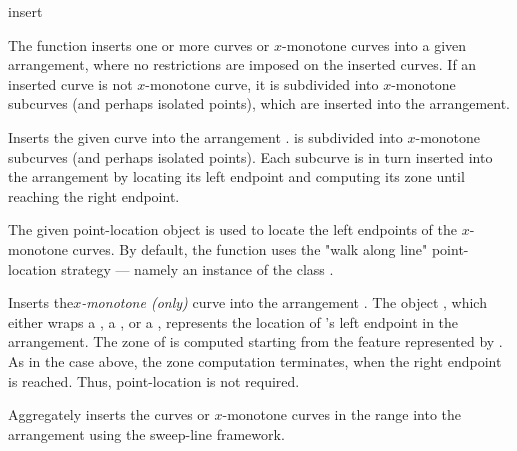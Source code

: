 \ccRefPageBegin

\begin{ccRefFunction}{insert}

\ccDefinition

The function \ccRefName{} inserts one or more curves or $x$-monotone curves
into a given arrangement, where no restrictions are imposed on the inserted
curves. If an inserted curve is not $x$-monotone curve, it is subdivided
into $x$-monotone subcurves (and perhaps isolated points), which are
inserted into the arrangement.



Inserts the given curve  into the arrangement .
 is subdivided into $x$-monotone subcurves (and perhaps isolated
points). Each subcurve is in turn inserted into the arrangement by locating
its left endpoint and computing its zone until reaching the right endpoint.

The given point-location object  is used to locate the left
endpoints of the $x$-monotone curves. By default, the function uses the
"walk along line" point-location strategy --- namely an instance of
the class .


Inserts the{\em $x$-monotone (only)} curve  into the
arrangement . The object , which either
wraps a , a , or a
, represents the location of 's left
endpoint in the arrangement. The zone of  is computed starting
from the feature represented by . As in the case above, the
zone computation terminates, when the right endpoint is reached.
Thus, point-location is not required. 


Aggregately inserts the curves or $x$-monotone curves in the range
\ccc{[first,last)} into the arrangement  using the sweep-line
framework.


\end{ccRefFunction}
